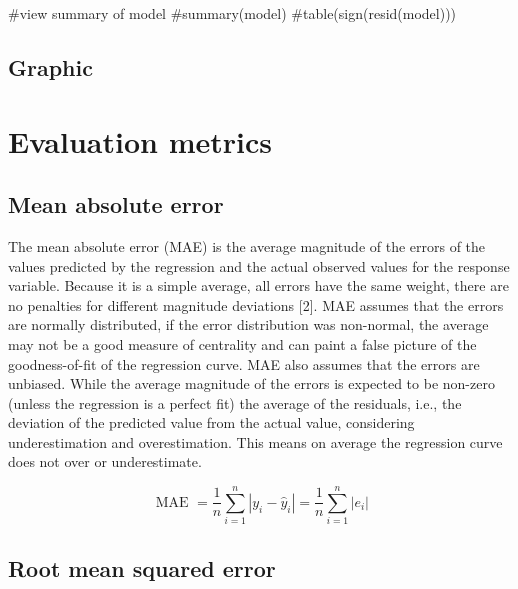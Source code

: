 \documentclass[
  letterpaper,
  DIV=11,
  numbers=noendperiod]{scrreprt}
\newenvironment{Shaded}{\begin{snugshade}}{\end{snugshade}}
\newcommand{\CommentTok}[1]{\textcolor[rgb]{0.37,0.37,0.37}{#1}}
\begin{document}
\begin{Shaded}
\begin{Highlighting}[]
\CommentTok{\#view summary of model}
\CommentTok{\#summary(model)}
\CommentTok{\#table(sign(resid(model)))}
\end{Highlighting}
\end{Shaded}

\hypertarget{graphic}{%
\subsection{Graphic}\label{graphic}}

\hypertarget{evaluation-metrics}{%
\section{Evaluation metrics}\label{evaluation-metrics}}

\hypertarget{mean-absolute-error}{%
\subsection{Mean absolute error}\label{mean-absolute-error}}

The mean absolute error (MAE) is the average magnitude of the errors of
the values predicted by the regression and the actual observed values
for the response variable. Because it is a simple average, all errors
have the same weight, there are no penalties for different magnitude
deviations {[}2{]}. MAE assumes that the errors are normally
distributed, if the error distribution was non-normal, the average may
not be a good measure of centrality and can paint a false picture of the
goodness-of-fit of the regression curve. MAE also assumes that the
errors are unbiased. While the average magnitude of the errors is
expected to be non-zero (unless the regression is a perfect fit) the
average of the residuals, i.e., the deviation of the predicted value
from the actual value, considering underestimation and overestimation.
This means on average the regression curve does not over or
underestimate.

\[
\text { MAE }=\frac{1}{n}\sum_{i=1}^n\left|y_i-\hat{y}_i\right|=\frac{1}{n}\sum_{i=1}^n\left|e_i\right|
\]

\hypertarget{root-mean-squared-error}{%
\subsection{Root mean squared error}\label{root-mean-squared-error}}
\end{document}
